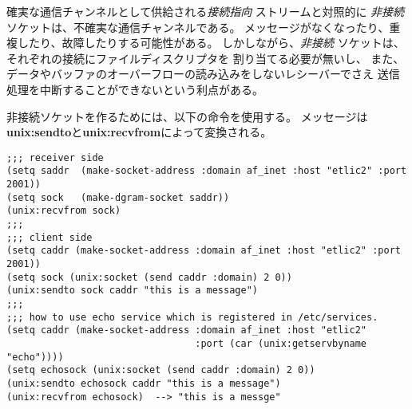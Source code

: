 確実な通信チャンネルとして供給される{\it 接続指向} ストリームと対照的に
{\it 非接続} ソケットは、不確実な通信チャンネルである。
メッセージがなくなったり、重複したり、故障したりする可能性がある。
しかしながら、{\it 非接続} ソケットは、それぞれの接続にファイルディスクリプタを
割り当てる必要が無いし、
また、データやバッファのオーバーフローの読み込みをしないレシーバーでさえ
送信処理を中断することができないという利点がある。

非接続ソケットを作るためには、以下の命令を使用する。
メッセージは{\bf unix:sendto}と{\bf unix:recvfrom}によって変換される。
\begin{verbatim}
;;; receiver side
(setq saddr  (make-socket-address :domain af_inet :host "etlic2" :port 2001))
(setq sock   (make-dgram-socket saddr))
(unix:recvfrom sock)
;;;
;;; client side
(setq caddr (make-socket-address :domain af_inet :host "etlic2" :port 2001))
(setq sock (unix:socket (send caddr :domain) 2 0))
(unix:sendto sock caddr "this is a message")
;;;
;;; how to use echo service which is registered in /etc/services.
(setq caddr (make-socket-address :domain af_inet :host "etlic2"
                                 :port (car (unix:getservbyname "echo"))))
(setq echosock (unix:socket (send caddr :domain) 2 0))
(unix:sendto echosock caddr "this is a message")
(unix:recvfrom echosock)  --> "this is a messge"
\end{verbatim}


\begin{refdesc}







\end{refdesc}

